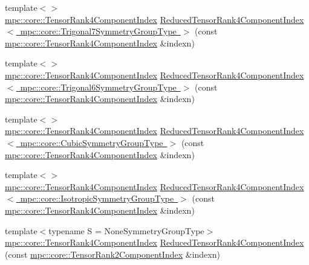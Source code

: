 \begin{DoxyCompactItemize}
\item 
{\footnotesize template$<$$>$ }\\\mbox{\hyperlink{namespacempc_1_1core_a54c081f41b2475abd10182bf023805d2}{mpc\+::core\+::\+Tensor\+Rank4\+Component\+Index}} \mbox{\hyperlink{namespacempc_1_1core_a156205a65087ea1d9c9fb9dbcd1578a6}{Reduced\+Tensor\+Rank4\+Component\+Index$<$ mpc\+::core\+::\+Trigonal7\+Symmetry\+Group\+Type $>$}} (const \mbox{\hyperlink{namespacempc_1_1core_a54c081f41b2475abd10182bf023805d2}{mpc\+::core\+::\+Tensor\+Rank4\+Component\+Index}} \&indexn)
\item 
{\footnotesize template$<$$>$ }\\\mbox{\hyperlink{namespacempc_1_1core_a54c081f41b2475abd10182bf023805d2}{mpc\+::core\+::\+Tensor\+Rank4\+Component\+Index}} \mbox{\hyperlink{namespacempc_1_1core_ad1ff1df316ea57d13729b92536925713}{Reduced\+Tensor\+Rank4\+Component\+Index$<$ mpc\+::core\+::\+Trigonal6\+Symmetry\+Group\+Type $>$}} (const \mbox{\hyperlink{namespacempc_1_1core_a54c081f41b2475abd10182bf023805d2}{mpc\+::core\+::\+Tensor\+Rank4\+Component\+Index}} \&indexn)
\item 
{\footnotesize template$<$$>$ }\\\mbox{\hyperlink{namespacempc_1_1core_a54c081f41b2475abd10182bf023805d2}{mpc\+::core\+::\+Tensor\+Rank4\+Component\+Index}} \mbox{\hyperlink{namespacempc_1_1core_ab982d8ea9335e8a18cd3cd4aea421048}{Reduced\+Tensor\+Rank4\+Component\+Index$<$ mpc\+::core\+::\+Cubic\+Symmetry\+Group\+Type $>$}} (const \mbox{\hyperlink{namespacempc_1_1core_a54c081f41b2475abd10182bf023805d2}{mpc\+::core\+::\+Tensor\+Rank4\+Component\+Index}} \&indexn)
\item 
{\footnotesize template$<$$>$ }\\\mbox{\hyperlink{namespacempc_1_1core_a54c081f41b2475abd10182bf023805d2}{mpc\+::core\+::\+Tensor\+Rank4\+Component\+Index}} \mbox{\hyperlink{namespacempc_1_1core_a598e37b7032dc2f900ba4e30bb7aeea5}{Reduced\+Tensor\+Rank4\+Component\+Index$<$ mpc\+::core\+::\+Isotropic\+Symmetry\+Group\+Type $>$}} (const \mbox{\hyperlink{namespacempc_1_1core_a54c081f41b2475abd10182bf023805d2}{mpc\+::core\+::\+Tensor\+Rank4\+Component\+Index}} \&indexn)
\item 
{\footnotesize template$<$typename S  = None\+Symmetry\+Group\+Type$>$ }\\\mbox{\hyperlink{namespacempc_1_1core_a54c081f41b2475abd10182bf023805d2}{mpc\+::core\+::\+Tensor\+Rank4\+Component\+Index}} \mbox{\hyperlink{namespacempc_1_1core_af5434f54bedc11f7a8ace3b9b11fb6ff}{Reduced\+Tensor\+Rank4\+Component\+Index}} (const \mbox{\hyperlink{namespacempc_1_1core_a7ae080dac58868c1e167479dce34928a}{mpc\+::core\+::\+Tensor\+Rank2\+Component\+Index}} \&indexn)

\end{DoxyCompactItemize}
